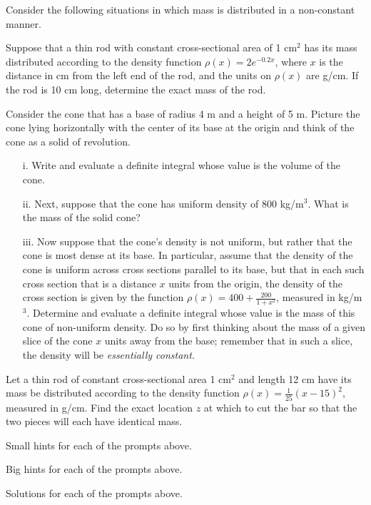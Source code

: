 \begin{activity} \label{A:6.3.1}  Consider the following situations in which mass is distributed in a non-constant manner.
\ba
	\item Suppose that a thin rod with constant cross-sectional area of 1 cm$^2$ has its mass distributed according to the density function $\rho(x) = 2e^{-0.2x}$, where $x$ is the distance in cm from the left end of the rod, and the units on $\rho(x)$ are g/cm.  If the rod is 10 cm long, determine the exact mass of the rod.
	
	\item Consider the cone that has a base of radius 4 m and a height of 5 m.  Picture the cone lying horizontally with the center of its base at the origin and think of the cone as a solid of revolution.  
	\begin{itemize}
		\item[i.]  Write and evaluate a definite integral whose value is the volume of the cone.

		\item[ii.]  Next, suppose that the cone has uniform density of 800 kg/m$^3$.  What is the mass of the solid cone?

		\item[iii.] Now suppose that the cone's density is not uniform, but rather that the cone is most dense at its base.  In particular, assume that the density of the cone is uniform across cross sections parallel to its base, but that in each such cross section that is a distance $x$ units from the origin, the density of the cross section is given by the function $\rho(x) = 400 + \frac{200}{1+x^2}$, measured in kg/m$^3$.  Determine and evaluate a definite integral whose value is the mass of this cone of non-uniform density.  Do so by first thinking about the mass of a given slice of the cone $x$ units away from the base; remember that in such a slice, the density will be \emph{essentially constant}.
	\end{itemize}

	\item Let a thin rod of constant cross-sectional area 1 cm$^2$ and length 12 cm have its mass be distributed according to the density function $\rho(x) = \frac{1}{25}(x-15)^2$, measured in g/cm.  Find the exact location $z$ at which to cut the bar so that the two pieces will each have identical mass.

\ea

\end{activity}
\begin{smallhint}
\ba
	\item Small hints for each of the prompts above.
\ea
\end{smallhint}
\begin{bighint}
\ba
	\item Big hints for each of the prompts above.
\ea
\end{bighint}
\begin{activitySolution}
\ba
	\item Solutions for each of the prompts above.
\ea
\end{activitySolution}
\aftera